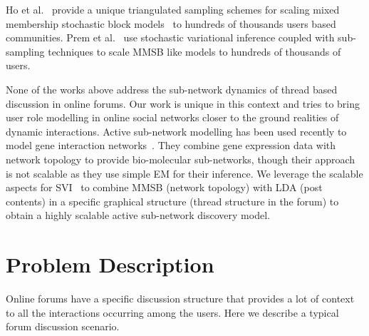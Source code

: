 \documentclass{sig-alternate}
\begin{document}
Ho et al.~\cite{HoYX12} provide a unique triangulated sampling schemes for scaling
mixed membership stochastic block models~\cite{Airoldi:2008:MMS:1390681.1442798} to
hundreds of thousands users based communities. Prem et al.~\cite{conf/nips/GopalanMGFB12}
use stochastic variational inference coupled with sub-sampling techniques to
scale MMSB like models to hundreds of thousands of users.

None of the works above address the sub-network dynamics of thread based
discussion in online forums. Our work is unique in this context and tries to
bring user role modelling in online social networks closer to the ground
realities of dynamic interactions. Active sub-network modelling has been used
recently to model gene interaction networks~\cite{Lichtenstein:Charleston}. They
combine gene expression data with network topology to provide bio-molecular 
sub-networks, though their approach is not scalable as they use simple EM for
their inference. We leverage the scalable aspects for
SVI~\cite{Hoffman:2013:SVI} to combine MMSB (network topology) with LDA (post
contents) in a specific graphical structure (thread structure in the forum) to
obtain a highly scalable active sub-network discovery model.



\section{Problem Description}
\label{sec:approach}
Online forums have a specific discussion structure  that
provides a lot of context to all the interactions occurring among the users.
Here we describe a typical forum discussion scenario.
\end{document}
